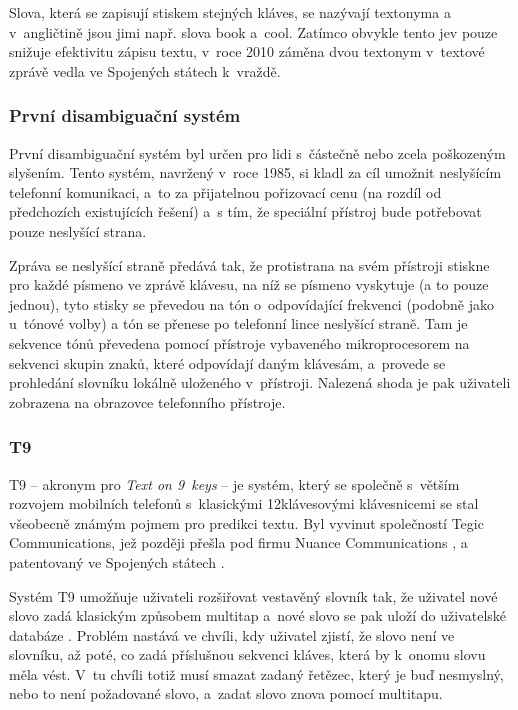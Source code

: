 \documentclass[a4paper,11pt,openany]{book} %
\newcommand\exmp{\textsf}
\begin{document}
Slova, která se zapisují stiskem stejných kláves, se nazývají textonyma \parencite{ericzorn2007} a v~angličtině jsou jimi např. slova \exmp{book} a~\exmp{cool}. Zatímco obvykle tento jev pouze snižuje efektivitu zápisu textu, v~roce 2010 záměna dvou textonym v~textové zprávě vedla ve Spojených státech k~vraždě. \parencite{t9kill}

\subsubsection{První disambiguační systém} 

První disambiguační systém byl určen pro lidi s~částečně nebo zcela poškozeným slyšením. Tento systém, navržený v~roce 1985, si kladl za cíl umožnit neslyšícím telefonní komunikaci, a~to za přijatelnou pořizovací cenu (na rozdíl od předchozích existujících řešení) a~s tím, že speciální přístroj bude potřebovat pouze neslyšící strana. \parencite{feinson1988interpretive}

Zpráva se neslyšící straně předává tak, že protistrana na svém přístroji stiskne pro každé písmeno ve zprávě klávesu, na níž se písmeno vyskytuje (a to pouze jednou), tyto stisky se převedou na tón o~odpovídající frekvenci (podobně jako u~tónové volby) a tón se přenese po telefonní lince neslyšící straně. Tam je sekvence tónů převedena pomocí přístroje vybaveného mikroprocesorem na sekvenci skupin znaků, které odpovídají daným klávesám, a~provede se prohledání slovníku lokálně uloženého v~přístroji. Nalezená shoda je pak uživateli zobrazena na obrazovce telefonního přístroje.

\subsubsection{T9}\label{t9}

T9 -- akronym pro {\it Text on 9~keys} -- je systém, který se společně s~větším rozvojem mobilních telefonů s~klasickými 12klávesovými klávesnicemi se stal všeobecně známým pojmem pro predikci textu. Byl vyvinut společností Tegic Communications, jež později přešla pod firmu Nuance Communications \parencite{nuancecommunications2007}, a patentovaný ve Spojených státech \parencite{grover1998reduced}. 

Systém T9 umožňuje uživateli rozšiřovat vestavěný slovník tak, že uživatel nové slovo zadá klasickým způsobem multitap a~nové slovo se pak uloží do uživatelské databáze \parencite{t9about}. %
Problém nastává ve chvíli, kdy uživatel zjistí, že slovo není ve slovníku, až poté, co zadá příslušnou sekvenci kláves, která by k~onomu slovu měla vést. V~tu chvíli totiž musí smazat zadaný řetězec, který je buď nesmyslný, nebo to není požadované slovo, a~zadat slovo znova pomocí multitapu.
\end{document}

